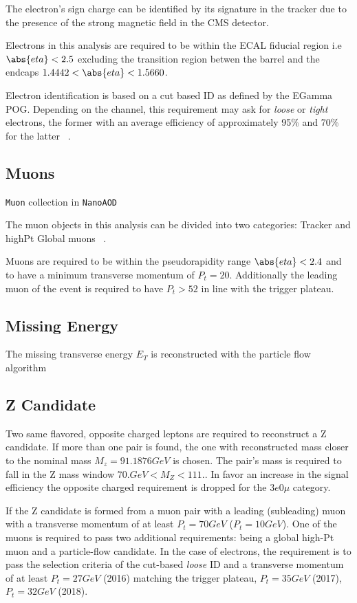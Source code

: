 The electron's sign charge can be identified by its signature in the tracker
due to the presence of the strong magnetic field in the CMS detector.

Electrons in this analysis are required to be within the ECAL fiducial
region i.e $\abs{eta}<2.5$ excluding the transition region betwen the
barrel and the endcaps $1.4442<\abs{eta}<1.5660$.

Electron identification is based on a cut based ID as defined by the
EGamma POG. Depending on the channel, this requirement
may ask for \emph{loose} or \emph{tight} electrons, the former with an
average efficiency of approximately 95\% and 70\% for
the latter ~\cite{EGammaPOG_el}.

\subsection{Muons}

\verb|Muon| collection in \verb|NanoAOD|

The muon objects in this analysis can be divided into two categories:
Tracker and highPt Global muons ~\cite{MuonPOG}.

Muons are required to be within the pseudorapidity range $\abs{eta}<2.4$ and
to have a minimum transverse momentum of $P_t=20$. Additionally the leading muon of
the event is required to have $P_t>52$ in line with the trigger plateau.

\subsection{Missing Energy}

The missing transverse energy $E_T$ is reconstructed with the particle flow
algorithm ~\cite{particleflow}

\subsection{Z Candidate}

Two same flavored, opposite charged leptons are required to reconstruct a Z
candidate. If more than one pair is found, the one with reconstructed mass
closer to the nominal mass $M_z= 91.1876 GeV$ is chosen. The pair's mass
is required to fall in the Z mass window $ 70. GeV < M_Z < 111.$. In favor an
increase in the signal efficiency the opposite charged requirement is dropped
for the $3e0\mu$ category.

If the Z candidate is formed from a muon pair with a leading (subleading) muon with
a transverse momentum of at least $P_t=70 GeV$ ($P_t=10GeV$). One of the
muons is required to pass two additional requirements: being a global high-Pt muon and a
particle-flow candidate. In the case of electrons, the requirement is to pass the
selection criteria of the cut-based \emph{loose} ID and a transverse momentum of
at least $P_t=27GeV$ (2016) matching the trigger plateau, $P_t=35GeV$ (2017),
$P_t=32GeV$ (2018).

